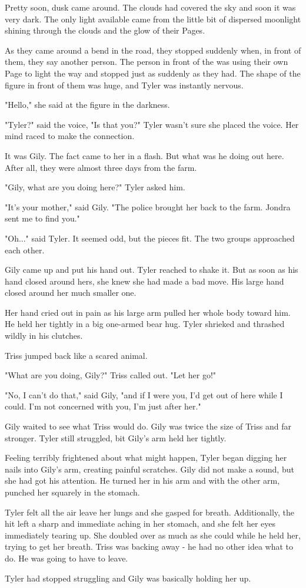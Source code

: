 \documentclass[courier]{sffms}
\begin{document}
Pretty soon, dusk came around. The clouds had
covered the sky and soon it was very dark. The
only light available came from the little bit of
dispersed moonlight shining through the clouds
and the glow of their Pages.

As they came around a bend in the road, they
stopped suddenly when, in front of them, they
say another person. The person in front of the
was using their own Page to light the way and
stopped just as suddenly as they had.
The shape of the figure in front of them was
huge, and Tyler was instantly nervous.

"Hello," she said at the figure in the darkness.

"Tyler?" said the voice, "Is that you?" Tyler
wasn't sure she placed the voice. Her mind
raced to make the connection.

It was Gily. The fact came to her in a flash. But
what was he doing out here. After all, they were
almost three days from the farm.

"Gily, what are you doing here?" Tyler asked him.

"It's your mother," said Gily. "The police brought
her back to the farm. Jondra sent me to find you."

"Oh..." said Tyler. It seemed odd, but the
pieces fit. The two groups approached each other.

Gily came up and put his hand out. Tyler
reached to shake it. But as soon as his hand closed
around hers, she knew she had made a bad move.
His large hand closed around her much smaller one.

Her hand cried out in pain as his large arm pulled
her whole body toward him. He held her tightly in
a big one-armed bear hug. Tyler shrieked and thrashed
wildly in his clutches.

Triss jumped back like a scared animal.

"What are you doing, Gily?" Triss called out. "Let
her go!"

"No, I can't do that," said Gily, "and if I were you,
I'd get out of here while I could. I'm not concerned
with you, I'm just after her."

Gily waited to see what Triss would do. Gily was twice
the size of Triss and far stronger. Tyler still struggled,
bit Gily's arm held her tightly.

Feeling terribly frightened
about what might happen, Tyler began digging her
nails into Gily's arm, creating painful scratches. Gily
did not make a sound, but she had got his attention.
He turned her in his arm and with the other arm,
punched her squarely in the stomach.

Tyler felt all the air leave her lungs and she gasped
for breath. Additionally, the hit left a sharp and
immediate aching in her stomach, and she felt
her eyes immediately tearing up. She doubled over
as much as she could while he held her, trying to get
her breath. Triss was backing away - he had no other
idea what to do. He was going to have to leave.

Tyler had stopped struggling and Gily was basically holding
her up.
\end{document}
